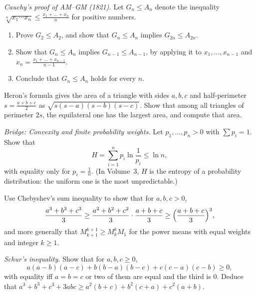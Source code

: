 \begin{exercise}[$\star\star$]\label{ex:cauchyinduction}
\emph{Cauchy's proof of AM--GM (1821).} Let $G_n\le A_n$ denote the inequality $\sqrt[n]{x_1\cdots x_n}\le\frac{x_1+\dots+x_n}n$ for positive numbers.
\begin{enumerate}[label=(\alph*)]
\item Prove $G_2\le A_2$, and show that $G_n\le A_n$ implies $G_{2n}\le A_{2n}$.
\item Show that $G_n\le A_n$ implies $G_{n-1}\le A_{n-1}$, by applying it to $x_1,\dots,x_{n-1}$ and $x_n=\frac{x_1+\dots+x_{n-1}}{n-1}$.
\item Conclude that $G_n\le A_n$ holds for every $n$.
\end{enumerate}
\end{exercise}

\begin{exercise}[$\star\star$]\label{ex:heron}
Heron's formula gives the area of a triangle with sides $a,b,c$ and half-perimeter $s=\frac{a+b+c}2$ as $\sqrt{s(s-a)(s-b)(s-c)}$. Show that among all
triangles of perimeter $2s$, the equilateral one has the largest area, and compute that area.
\end{exercise}

\begin{exercise}[$\star\star$]\label{ex:entropy}
\emph{Bridge: Convexity and finite probability weights.}
Let $p_1,\dots,p_n>0$ with $\sum p_i=1$. Show that
\[
H=\sum_{i=1}^np_i\ln\frac1{p_i}\le\ln n,
\]
with equality only for $p_i=\frac1n$. (In Volume~3, $H$ is the entropy of a probability distribution: the uniform one is the most unpredictable.)
\end{exercise}

\begin{exercise}[$\star\star$]\label{ex:chebsumapp}
Use Chebyshev's sum inequality to show that for $a,b,c>0$,
\[
\frac{a^3+b^3+c^3}3\ge\frac{a^2+b^2+c^2}3\cdot\frac{a+b+c}3\ge\Bigl(\frac{a+b+c}3\Bigr)^3,
\]
and more generally that $M_{k+1}^{k+1}\ge M_k^kM_1$ for the power means with equal weights and integer $k\ge1$.
\end{exercise}

\begin{exercise}[$\star\star\star$]\label{ex:schur}
\emph{Schur's inequality.} Show that for $a,b,c\ge0$,
\[
a(a-b)(a-c)+b(b-a)(b-c)+c(c-a)(c-b)\ge0,
\]
with equality iff $a=b=c$ or two of them are equal and the third is $0$. Deduce that $a^3+b^3+c^3+3abc\ge a^2(b+c)+b^2(c+a)+c^2(a+b)$.
\end{exercise}

